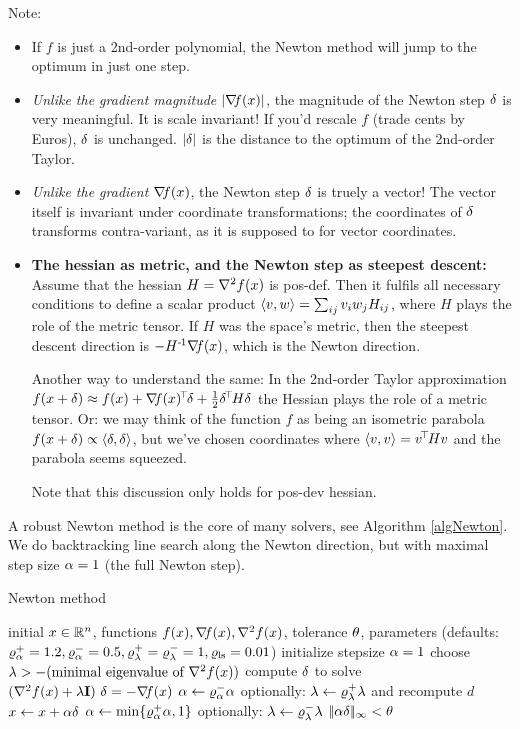 Note:
\begin{itemize}
\item If $f$ is just a 2nd-order polynomial, the Newton method will
jump to the optimum in just one step.

\item \emph{Unlike the gradient magnitude $|{\nabla_{\!\!}} f(x)|$}, the magnitude of the
Newton step $\delta$ is very meaningful. It is scale invariant! If you'd
rescale $f$ (trade cents by Euros), $\delta$ is unchanged. $|\delta|$ is the
distance to the optimum of the 2nd-order Taylor.

\item \emph{Unlike the gradient ${\nabla_{\!\!}} f(x)$}, the Newton step $\delta$ is truely a
vector! The vector itself is invariant under coordinate
transformations; the coordinates of $\delta$ transforms contra-variant,
as it is supposed to for vector coordinates.

\item \textbf{The hessian as metric, and the Newton step as steepest descent:} Assume that the hessian $H = {\nabla_{\!\!}^2}
f(x)$ is pos-def. Then it fulfils all necessary conditions to define a
scalar product $\langle v ,w\rangle = \sum_{ij} v_i w_j H_{ij}$, where $H$ plays
the role of the metric tensor. If $H$ was the space's metric, then the
steepest descent direction is $- H^{{\hspace*{-.0pt}\text{\rm -}\hspace*{-.5pt}}1} {\nabla_{\!\!}} f(x)$, which is the Newton
direction.

Another way to understand the same: In the 2nd-order Taylor
approximation $f(x+\delta) \approx f(x) + {\nabla_{\!\!}} f(x)^{\!\top\!}\delta + \frac{1}{2} \delta^{\!\top\!} H
\delta$ the Hessian plays the role of a metric tensor. Or: we may think
of the function $f$ as being an isometric parabola $f(x+\delta) \propto
\langle\delta,\delta\rangle$, but we've chosen coordinates where $\langle v,v\rangle = v^{\!\top\!} H v$ and
the parabola seems squeezed.

Note that this discussion only holds for pos-dev hessian.
\end{itemize}

A robust Newton method is the core of many solvers, see Algorithm
\ref{algNewton}. We do backtracking line search along the Newton
direction, but with maximal step size $\alpha=1$ (the full Newton step).

\begin{algorithm}
\caption{\label{algNewton} Newton method}
\begin{algorithmic}[1]
\Require initial $x\in{\mathbb{R}}^n$, functions $f(x), {\nabla_{\!\!}} f(x), {\nabla_{\!\!}^2} f(x)$,
tolerance $\theta$, parameters (defaults:
$\varrho_\alpha^+=1.2, \varrho_\alpha^-=0.5, \varrho_\lambda^+=\varrho_\lambda^-=1, \varrho_{\text{ls}}=0.01$)
\State initialize stepsize $\alpha=1$
\Repeat
\State choose $\lambda>-(\text{minimal eigenvalue of ${\nabla_{\!\!}^2} f(x)$})$
\State compute ${\delta}$ to solve $({\nabla_{\!\!}^2} f(x) + \lambda {\rm\bf I})~ {\delta} = - {\nabla_{\!\!}}
f(x)$ \label{alg0}
 
\State $\alpha \gets \varrho_\alpha^-\alpha$ 
\State optionally: $\lambda \gets \varrho_\lambda^+\lambda$ and recompute $d$ 
\EndWhile
\State $x \gets x + \alpha{\delta}$ 
\State $\alpha \gets \min\{\varrho_\alpha^+\alpha,1\}$ 
\State optionally: $\lambda \gets \varrho_\lambda^-\lambda$ 
\Until $|\!|\alpha{\delta}|\!|_\infty < \theta$
\end{algorithmic}
\end{algorithm}

